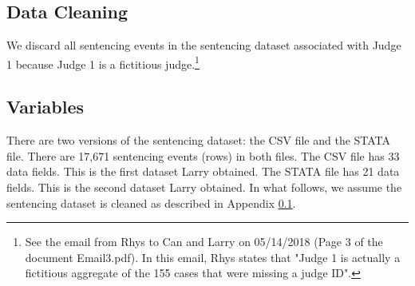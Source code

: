 \documentclass[11pt]{article}
\theoremstyle{ModifiedStyle}
\begin{document}
  \subsection{Data Cleaning}
    \label{Sec:Appendix:Data_Cleaning}
    We discard all sentencing events in the sentencing dataset associated with Judge 1 because Judge 1 is a fictitious judge.\footnote{See the email from Rhys to Can and Larry on 05/14/2018 (Page 3 of the document Email3.pdf). In this email, Rhys states that "Judge 1 is actually a fictitious aggregate of the 155 cases that were missing a judge ID".}

  \subsection{Variables}
  	There are two versions of the sentencing dataset: the CSV file and the STATA file. There are 17,671 sentencing events (rows) in both files. The CSV file has 33 data fields. This is the first dataset Larry obtained. The STATA file has 21 data fields. This is the second dataset Larry obtained. In what follows, we assume the sentencing dataset is cleaned as described in Appendix \ref{Sec:Appendix:Data_Cleaning}.
\end{document}
